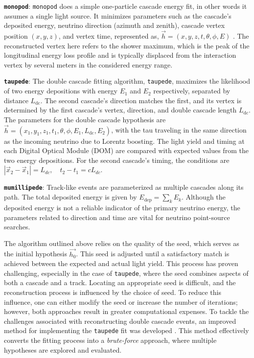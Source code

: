 \textbf{\texttt{monopod}}: \texttt{monopod} does a simple one-particle cascade energy fit, in other words it assumes a single light source. It minimizes parameters such as the cascade's deposited energy, neutrino direction (azimuth and zenith), cascade vertex position $(x, y, z)$, and vertex time, represented as, $\vec{h} = (x, y, z, t, \theta, \phi, E)$ . The reconstructed vertex here refers to the shower maximum, which is the peak of the longitudinal energy loss profile and is typically displaced from the interaction vertex by several meters in the considered energy range.

\textbf{\texttt{taupede}}: The double cascade fitting algorithm, \texttt{taupede}, maximizes the likelihood of two energy depositions with energy $E_1$ and $E_2$ respectively, separated by distance $L_{\mathrm{dc}}$. The second cascade's direction matches the first, and its vertex is determined by the first cascade's vertex, direction, and double cascade length $L_{\mathrm{dc}}$. The parameters for the double cascade hypothesis are $\vec{h} = (x_1, y_1, z_1, t_1, \theta, \phi, E_1, L_{\mathrm{dc}}, E_2)$, with the tau traveling in the same direction as the incoming neutrino due to Lorentz boosting. The light yield and timing at each Digital Optical Module (DOM) are compared with expected values from the two energy depositions. For the second cascade's timing, the conditions are $|\vec{x}_2 - \vec{x}_1| = L_{dc}, \quad t_2 - t_1 = c L_{dc}$. 

\textbf{\texttt{mumillipede}}: Track-like events are parameterized as multiple cascades along its path. The total deposited energy is given by $E_{\text{dep}} = \sum_k E_k$. Although the deposited energy is not a reliable indicator of the primary neutrino energy, the parameters related to direction and time are vital for neutrino point-source searches.

The algorithm outlined above relies on the quality of the seed, which serves as the initial hypothesis $\vec{h_0}$. This seed is adjusted until a satisfactory match is achieved between the expected and actual light yield. This process has proven challenging, especially in the case of \texttt{taupede}, where the seed combines aspects of both a cascade and a track. Locating an appropriate seed is difficult, and the reconstruction process is influenced by the choice of seed. To reduce this influence, one can either modify the seed or increase the number of iterations; however, both approaches result in greater computational expenses. To tackle the challenges associated with reconstructing double cascade events, an improved method for implementing the \texttt{taupede} fit was developed . This method effectively converts the fitting process into a \emph{brute-force} approach, where multiple hypotheses are explored and evaluated.

